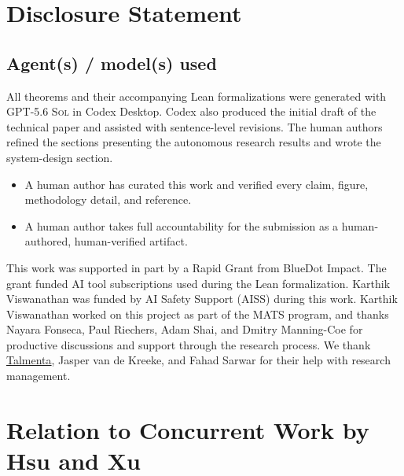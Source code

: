 \documentclass{article}
\theoremstyle{definition}
\theoremstyle{plain}
\newcommand{\gpt}{\textsc{GPT-5.6 Sol}\xspace}
\begin{document}
\section{Disclosure Statement}

\subsection*{Agent(s) / model(s) used}

All theorems and their accompanying Lean formalizations were generated with \gpt{} in Codex Desktop. Codex also produced the initial draft of the technical paper and assisted with sentence-level revisions. The human authors refined the sections presenting the autonomous research results and wrote the system-design section.

\begin{itemize}[leftmargin=1.8em,nosep]
  \item[$\boxed{\checkmark}$] A human author has curated this work and verified every claim, figure, methodology detail, and reference.
  \item[$\boxed{\checkmark}$]  A human author takes full accountability for the submission as a human-authored, human-verified artifact.
\end{itemize}

\begin{ack}
This work was supported in part by a Rapid Grant from BlueDot Impact. The grant funded AI tool subscriptions used during the Lean formalization. Karthik Viswanathan was funded by AI Safety Support (AISS) during this work. Karthik Viswanathan worked on this project as part of the MATS program, and thanks Nayara Fonseca, Paul Riechers, Adam Shai, and Dmitry Manning-Coe for productive discussions and support through the research process. We thank \href{https://talmenta.org}{Talmenta}, Jasper van de Kreeke, and Fahad Sarwar for their help with research management.
\end{ack}

\clearpage
\renewcommand{\bibsection}{\section{References}}



\clearpage
\section{Relation to Concurrent Work by Hsu and Xu}
\label{app:hsu-comparison}
\end{document}
